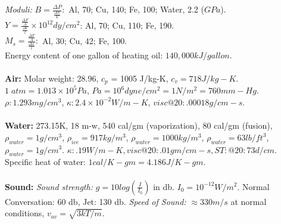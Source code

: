 \emph{Moduli:}
$B= {\frac {\Delta P} {\frac {\Delta V} {V}}}:$ Al, 70;
Cu, 140; Fe, 100; Water, 2.2 ($GPa$).  \\
$Y= {\frac {\frac {\Delta F}{A}} {\frac {\Delta l}{l}}} \times
10^{12} dy/cm^{2}$: Al, 70; Cu, 110; Fe, 190.  \\
$M_{s} = {\frac {\frac {\Delta F} {A}} {\frac {\Delta x} {l}}}:$
Al, 30; Cu, 42; Fe, 100.\\
Energy content of one gallon of heating oil: $140,000 kJ/gallon$.
\\
\\
{\bf Air:} Molar weight: 28.96, $c_{p}$ = 1005 J/kg-K, $c_{v} = 718 J/kg-K$.
$1\; atm= 1.013 \times 10^{5} Pa$, $Pa= 10^{6} dyne/cm^{2}= 1N/m^2=760 mm-Hg$.
$\rho: 1.293 mg/cm^{3}$, $\kappa :  2.4 \times 10^{-2} W/m-K$, $visc@20: .00018 g/cm-s.$
\\
\\
{\bf Water:} 273.15K, 18 m-w, 540 cal/gm (vaporization), 80 cal/gm (fusion),
$\rho_{water} = 1 g / cm^{3}$,
$\rho_{ice} = 917 kg / m^{3}$,
$\rho_{water} = 1000 kg / m^{3}$,
$\rho_{water} = 63 lb / ft^{3}$,
$\rho_{water} = 1 g / cm^{3}$.
$\kappa:  .19 W/m-K, visc@20: .01gm/cm-s, ST: @20: 73d/cm.$  Specific
heat of water: $1 cal/K-gm= 4.186 J/K-gm$.
\\
\\
{\bf Sound:}
\emph{Sound strength:} $g= 10 log({\frac {I} {I_0}})$ in db.  $I_0 = 10^{-12}
W/m^2$. Normal Conversation: 60 db, Jet: 130 db.
\emph{Speed of Sound:}
$\approx 330 m/s$ at normal conditions,
$v_{av} = {\sqrt { {3 k T } / m }}$.
\\
\\

